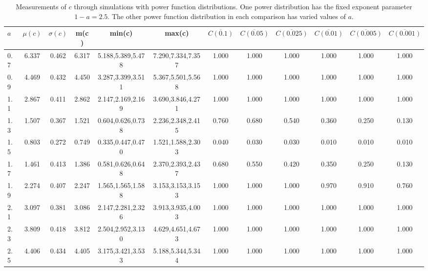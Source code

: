 \begin{table*}[h!]
\begin{center}
\begin{tabular}{| l | c | c | c | c | c | c | c | c | c | c | c |}\hline
$a$ & $\mu(c)$ & $\sigma(c)$ & m(c) & min(c) & max(c) & $\overline{C(0.1)}$ & $\overline{C(0.05)}$ & $\overline{C(0.025)}$ & $\overline{C(0.01)}$ & $\overline{C(0.005)}$ & $\overline{C(0.001)}$ \\\hline
0.7 & 6.337 & 0.462 & 6.317 & 5.188,5.389,5.478 & 7.290,7.334,7.357  & 1.000  & 1.000  & 1.000  & 1.000  & 1.000  & 1.000 \\\hline
0.9 & 4.469 & 0.432 & 4.450 & 3.287,3.399,3.511 & 5.367,5.501,5.568  & 1.000  & 1.000  & 1.000  & 1.000  & 1.000  & 1.000 \\\hline
1.1 & 2.867 & 0.411 & 2.862 & 2.147,2.169,2.169 & 3.690,3.846,4.271  & 1.000  & 1.000  & 1.000  & 1.000  & 1.000  & 1.000 \\\hline
1.3 & 1.507 & 0.367 & 1.521 & 0.604,0.626,0.738 & 2.236,2.348,2.415  & 0.760  & 0.680  & 0.540  & 0.360  & 0.250  & 0.130 \\\hline
1.5 & 0.803 & 0.272 & 0.749 & 0.335,0.447,0.470 & 1.521,1.588,2.303  & 0.040  & 0.030  & 0.030  & 0.010  & 0.010  & 0.010 \\\hline
1.7 & 1.461 & 0.413 & 1.386 & 0.581,0.626,0.648 & 2.370,2.393,2.437  & 0.680  & 0.550  & 0.420  & 0.350  & 0.250  & 0.130 \\\hline
1.9 & 2.274 & 0.407 & 2.247 & 1.565,1.565,1.588 & 3.153,3.153,3.153  & 1.000  & 1.000  & 1.000  & 0.970  & 0.910  & 0.760 \\\hline
2.1 & 3.097 & 0.381 & 3.086 & 2.147,2.281,2.326 & 3.913,3.935,4.003  & 1.000  & 1.000  & 1.000  & 1.000  & 1.000  & 1.000 \\\hline
2.3 & 3.809 & 0.418 & 3.812 & 2.504,2.952,3.130 & 4.629,4.651,4.673  & 1.000  & 1.000  & 1.000  & 1.000  & 1.000  & 1.000 \\\hline
2.5 & 4.406 & 0.434 & 4.405 & 3.175,3.421,3.533 & 5.188,5.344,5.344  & 1.000  & 1.000  & 1.000  & 1.000  & 1.000  & 1.000 \\\hline
\end{tabular}
\caption{Measurements of $c$ through simulations
with power function distributions.
One power distribution has the fixed exponent parameter $1-a=2.5$.
The other power function distribution in each comparison
has varied values of $a$.}
\end{center}
\end{table*}